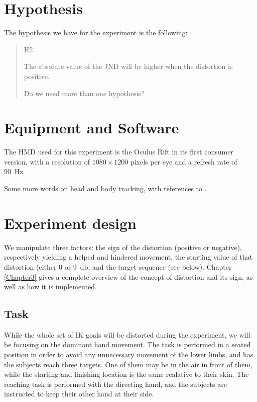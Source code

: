 \section{Hypothesis}

The hypothesis we have for the experiment is the following:

\begin{quote}
    \begin{labeling}[:]{H2}
      \item [H1] The absolute value of the JND will be higher when the distortion is positive.
      \item [H2] Do we need more than one hypothesis?
    \end{labeling}
\end{quote}

\section{Equipment and Software}

The HMD used for this experiment is the Oculus Rift in its first consumer version, with a resolution of $1080 \times 1200$ pixels per eye and a refresh rate of \SI{90}{\hertz}.

Some more words on head and body tracking, with references to \cite{molla2013singularity}.

\section{Experiment design}

We manipulate three factors: the sign of the distortion (positive or negative), respectively yielding a helped and hindered movement, the starting value of that distortion (either \num{0} or \SI{9}{\decibel}, and the target sequence (see below). Chapter \ref{Chapter3} gives a complete overview of the concept of distortion and its sign, as well as how it is implemented.

\subsection{Task}

While the whole set of IK goals will be distorted during the experiment, we will be focusing on the dominant hand movement. The task is performed in a seated position in order to avoid any unnecessary movement of the lower limbs, and has the subjects reach three targets. One of them may be in the air in front of them, while the starting and finishing location is the same realative to their skin. The reaching task is performed with the directing hand, and the subjects are instructed to keep their other hand at their side.

